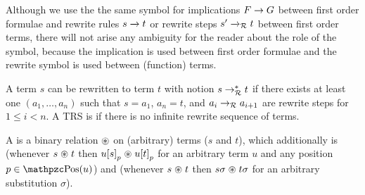 Although we use the the same symbol for implications \( F\rightarrow G \) between first order formulae
and rewrite rules \( s\xrightarrow[{}]{} t \) or rewrite steps \( s'\xrightarrow[{}]{}_{\mathcal{R}} t \) between first order terms,
there will not arise any ambiguity for the reader about the role of the symbol,
because the implication is used between first order formulae
and the rewrite symbol is used between (function) terms.
%
%
\begin{definition}\label{def:rewritten}
	A term \( s \) can be rewritten to term \( t \) with notion \( s\rightarrow^*_{\mathcal{R}} t \)
	if there exists at least one  \( (a_1,\ldots ,a_n) \) such that
	\( s=a_1 \), \( a_n=t \), and \( a_i\rightarrow_{\mathcal{R}} a_{i+1} \) are rewrite steps for \( 1\leq i<n \).
	A TRS is  if there is no infinite rewrite sequence of terms.
\end{definition}
%
\begin{definition}\label{def:closed-under}
	A  is a binary relation
	\( \mathrel{\circledast} \) on (arbitrary) terms (\( s \) and \( t \)),
	which additionally is 
	(whenever \( s\mathrel{\circledast} t \) then \( u{[s]}_p\mathrel{\circledast} u{[t]}_p \)
	for an arbitrary term \( u \) and any position \( p\in\pos(u) \))
	and 
	(whenever \( s\mathrel{\circledast} t \) then \( s\sigma\mathrel{\circledast} t\sigma \)
	for an arbitrary substitution \( \sigma \)).
\end{definition}
